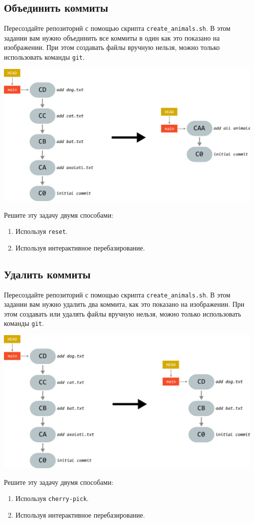 \documentclass{article}
\begin{document}
\subsection{Объединить коммиты}
Пересоздайте репозиторий с помощью скрипта \texttt{create\_animals.sh}.
В этом задании вам нужно объединить все коммиты в один как это показано на изображении. При этом создавать файлы вручную нельзя, можно только использовать команды \texttt{git}.
\begin{center}
\includegraphics[scale=0.8]{../images/squash_animals.png}
\end{center}
Решите эту задачу двумя способами:
\begin{enumerate}
\item Используя \texttt{reset}.
\item Используя интерактивное перебазирование.
\end{enumerate}

\subsection{Удалить коммиты}
Пересоздайте репозиторий с помощью скрипта \texttt{create\_animals.sh}.
В этом задании вам нужно удалить два коммита, как это показано на изображении. При этом создавать или удалять файлы вручную нельзя, можно только использовать команды \texttt{git}.
\begin{center}
\includegraphics[scale=0.8]{../images/delete_commits_animals.png}
\end{center}
Решите эту задачу двумя способами:
\begin{enumerate}
\item Используя \texttt{cherry-pick}.
\item Используя интерактивное перебазирование.
\end{enumerate}
\end{document}
